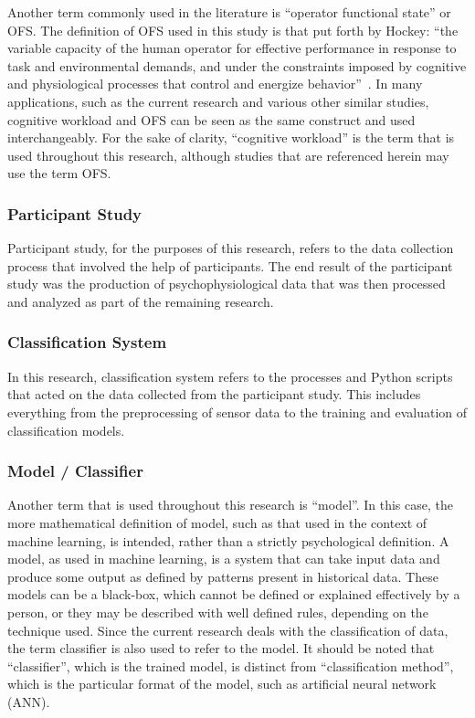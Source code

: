 \documentclass[11pt]{article}
\begin{document}
		Another term commonly used in the literature is ``operator functional state'' or OFS. The definition of OFS used in this study is that put forth by Hockey: ``the variable capacity of the human operator for effective performance in response to task and environmental demands, and under the constraints imposed by cognitive and physiological processes that control and energize behavior''~\cite{Hockey}. In many applications, such as the current research and various other similar studies, cognitive workload and OFS can be seen as the same construct and used interchangeably. For the sake of clarity, ``cognitive workload'' is the term that is used throughout this research, although studies that are referenced herein may use the term OFS.
		
		\subsubsection{Participant Study}
		Participant study, for the purposes of this research, refers to the data collection process that involved the help of participants. The end result of the participant study was the production of psychophysiological data that was then processed and analyzed as part of the remaining research. 
		
		\subsubsection{Classification System}
		In this research, classification system refers to the processes and Python scripts that acted on the data collected from the participant study. This includes everything from the preprocessing of sensor data to the training and evaluation of classification models. 		
		
		\subsubsection{Model / Classifier}
		Another term that is used throughout this research is ``model''. In this case, the more mathematical definition of model, such as that used in the context of machine learning, is intended, rather than a strictly psychological definition. A model, as used in machine learning, is a system that can take input data and produce some output as defined by patterns present in historical data. These models can be a black-box, which cannot be defined or explained effectively by a person, or they may be described with well defined rules, depending on the technique used. Since the current research deals with the classification of data, the term classifier is also used to refer to the model. It should be noted that ``classifier'', which is the trained model, is distinct from ``classification method'', which is the particular format of the model, such as artificial neural network (ANN).
	
\end{document}

